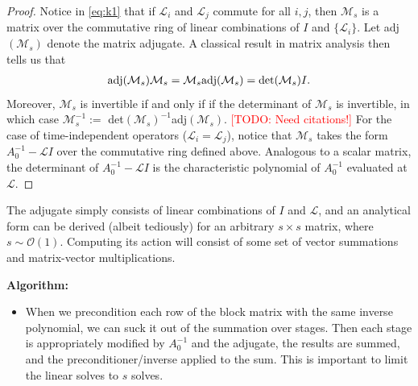 \documentclass[a4paper,10pt]{article}
\makeatletter
\newcommand{\todo}[1]{\textcolor{red}{[TODO\@: #1]}}
\makeatother
\begin{document}
%
\begin{proof}
Notice in \eqref{eq:k1} that if $\mathcal{L}_i$ and $\mathcal{L}_j$ commute for all $i,j$,
then $\mathcal{M}_s$ is a matrix over the commutative ring of linear combinations
of $I$ and $\{\mathcal{L}_i\}$. Let adj$(\mathcal{M}_s)$ denote the matrix adjugate. A
classical result in matrix analysis then tells us that
%
\begin{align*} 
\textnormal{adj}(\mathcal{M}_s)\mathcal{M}_s = \mathcal{M}_s\textnormal{adj}(\mathcal{M}_s)
	= \textnormal{det}(\mathcal{M}_s)I.
\end{align*}
%
Moreover, $\mathcal{M}_s$ is invertible if and only if if the determinant of $\mathcal{M}_s$
is invertible, in which case $\mathcal{M}_s^{-1} := $ det$(\mathcal{M}_s)^{-1}$adj$(\mathcal{M}_s)$.
\todo{Need citations!}
For the case of time-independent operators ($\mathcal{L}_i=\mathcal{L}_j$), notice that
$\mathcal{M}_s$ takes the form $A_0^{-1} - \mathcal{L}I$ over the commutative ring defined
above. Analogous to a scalar matrix, the determinant of $A_0^{-1} - \mathcal{L}I$ is the
characteristic polynomial of $A_0^{-1}$ evaluated at $\mathcal{L}$.
\end{proof}
%

The adjugate simply consists of linear combinations of $I$ and $\mathcal{L}$, and an analytical
form can be derived (albeit tediously) for an arbitrary $s\times s$ matrix, where
$s\sim\mathcal{O}(1)$. Computing its action will consist of some set of vector summations
and matrix-vector multiplications.



{\color{blue}
\textbf{Algorithm:}
\begin{itemize}
	\item When we precondition each row of the block matrix with the same inverse
	polynomial, we can suck it out of the summation over stages. Then each stage is
	appropriately modified by $A_0^{-1}$ and the adjugate, the results are summed,
	and the preconditioner/inverse applied to the sum. This is important to limit
	the linear solves to $s$ solves. 
\end{itemize}
}



\end{document}
